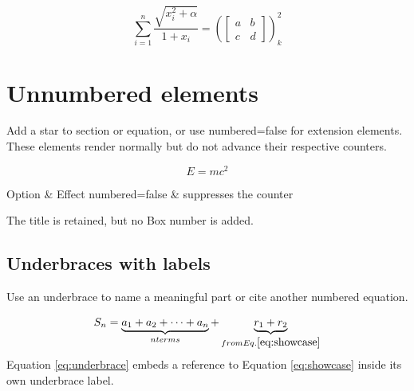 {\label{eq:showcase}
\begin{equation}
  \sum_{i=1}^{n} \frac{\sqrt{x_i^2 + \alpha}}{1 + x_i}
  = \left( \begin{bmatrix} a & b \\ c & d \end{bmatrix} \right)_{k}^{2}
\end{equation}

\section*{Unnumbered elements}
Add a star to section or equation, or use numbered=false for extension elements.
These elements render normally but do not advance their respective counters.

\begin{equation*}
  E = m c^2
\end{equation*}


\begin{asciitable}[width=\textwidth,numbered=false,align=lc,header=true,frame=single,caption="Unnumbered table"]
Option & Effect
numbered=false & suppresses the counter
\end{asciitable}

\begin{box}[width=\textwidth,numbered=false,style=rounded,title="Unnumbered box"]
The title is retained, but no Box number is added.
\end{box}

\enddiagram

\subsection{Underbraces with labels}
Use an underbrace to name a meaningful part or cite another numbered equation.

\label{eq:underbrace}
\begin{equation}
  S_n = \underbrace{a_1 + a_2 + \cdots + a_n}_{n terms}
  + \underbrace{r_1 + r_2}_{from Eq. \ref{eq:showcase}}
\end{equation}
Equation \ref{eq:underbrace} embeds a reference to Equation \ref{eq:showcase}
inside its own underbrace label.

}
